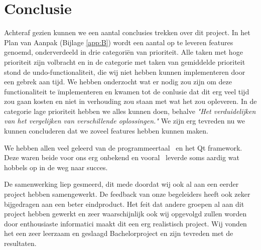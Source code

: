 \section{Conclusie}
Achteraf gezien kunnen we een aantal conclusies trekken over dit project. In het Plan van Aanpak (Bijlage \ref{app:B}) wordt een aantal op te leveren features genoemd, onderverdeeld in drie categori\"en van prioriteit. Alle taken met hoge prioriteit zijn volbracht en in de categorie met taken van gemiddelde prioriteit stond de undo-functionaliteit, die wij niet hebben kunnen implementeren door een gebrek aan tijd. We hebben onderzocht wat er nodig zou zijn om deze functionaliteit te \"implementeren en kwamen tot de conlusie dat dit erg veel tijd zou gaan kosten en niet in verhouding zou staan met wat het zou opleveren. In de categorie lage prioriteit hebben we alles kunnen doen, behalve \emph{"Het verduidelijken van het vergelijken van verschillende oplossingen."} We zijn erg tevreden nu we kunnen concluderen dat we zoveel features hebben kunnen maken.

We hebben allen veel geleerd van de programmeertaal \cpp\ en het Qt framework. Deze waren beide voor ons erg onbekend en vooral \cpp\ leverde soms aardig wat hobbels op in de weg naar succes. 

De samenwerking liep gesmeerd, dit mede doordat wij ook al aan een eerder project hebben samengewerkt. De feedback van onze begeleiders heeft ook zeker bijgedragen aan een beter eindproduct. Het feit dat andere groepen al aan dit project hebben gewerkt en zeer waarschijnlijk ook wij opgevolgd zullen worden door enthousiaste informatici maakt dit een erg realistisch project. Wij vonden het een zeer leerzaam en geslaagd Bachelorproject en zijn tevreden met de resultaten.
